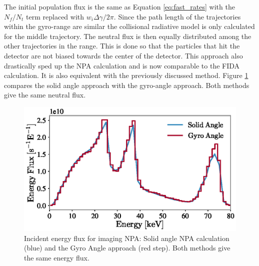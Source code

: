 The initial population flux is the same as Equation \ref{eq:fast_rates} with the $N_f/N_t$ term replaced with $w_i\Delta\gamma/2\pi$. Since the path length of the trajectories within the gyro-range are similar the collisional radiative model is only calculated for the middle trajectory. The neutral flux is then equally distributed among the other trajectories in the range. This is done so that the particles that hit the detector are not biased towards the center of the detector. This approach also drastically sped up the NPA calculation and is now comparable to the FIDA calculation. It is also equivalent with the previously discussed method. Figure \ref{fig:npa_flux} compares the solid angle approach with the gyro-angle approach. Both methods give the same neutral flux.
\begin{figure}[h!]
    \centering
    \includegraphics[width=13cm]{figures/inpa_flux.eps}
    \caption{Incident energy flux for imaging NPA: Solid angle NPA calculation (blue) and the Gyro Angle approach (red step). Both methods give the same energy flux.}
    \label{fig:npa_flux}
\end{figure}

